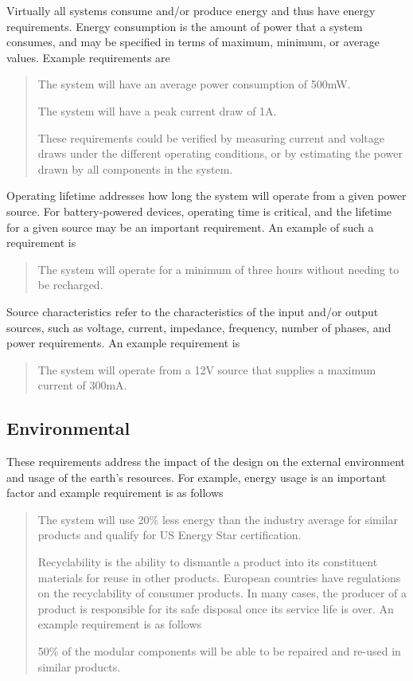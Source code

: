 Virtually all systems consume and/or produce energy and thus have energy
requirements. Energy consumption is the amount of power that a system
consumes, and may be specified in terms of maximum, minimum, or average
values. Example requirements are

\begin{quote}
The system will have an average power consumption of 500mW.

The system will have a peak current draw of 1A.

These requirements could be verified by measuring current and voltage
draws under the different operating conditions, or by estimating the
power drawn by all components in the system.
\end{quote}

Operating lifetime addresses how long the system will operate from a
given power source. For battery-powered devices, operating time is
critical, and the lifetime for a given source may be an important
requirement. An example of such a requirement is

\begin{quote}
The system will operate for a minimum of three hours without needing to
be recharged.
\end{quote}

Source characteristics refer to the characteristics of the input and/or
output sources, such as voltage, current, impedance, frequency, number
of phases, and power requirements. An example requirement is

\begin{quote}
The system will operate from a 12V source that supplies a maximum
current of 300mA.
\end{quote}

\subsection*{Environmental}
\label{section:environmental}

These requirements address the impact of the design on the external
environment and usage of the earth's resources. For example, energy
usage is an important factor and example requirement is as follows

\begin{quote}
The system will use 20\% less energy than the industry average for
similar products and qualify for US Energy Star certification.

Recyclability is the ability to dismantle a product into its constituent
materials for reuse in other products. European countries have
regulations on the recyclability of consumer products. In many cases,
the producer of a product is responsible for its safe disposal once its
service life is over. An example requirement is as follows

50\% of the modular components will be able to be repaired and re-used
in similar products.
\end{quote}

